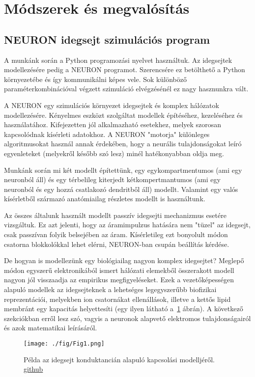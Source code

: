 \section{Módszerek és megvalósítás}

\subsection{NEURON idegsejt szimulációs program}
A munkánk során a Python programozási nyelvet használtuk. Az idegsejtek modellezésére pedig a NEURON programot. Szerencsére ez betölthető a Python környezetébe és így kommunikálni képes vele. Sok különböző paraméterkombinációval végzett szimuláció elvégzésénél ez nagy hasznunkra vált.

A NEURON egy szimulációs környezet idegsejtek és komplex hálózatok modellezésére. Kényelmes eszközt szolgáltat modellek építéséhez, kezeléséhez és használatához. Kifejezetten jól alkalmazható esetekhez, melyek szorosan kapcsolódnak kísérleti adatokhoz. A NEURON "motorja" különleges algoritmusokat használ annak érdekében, hogy a neurális tulajdonságokat leíró egyenleteket (melyekről később szó lesz) minél hatékonyabban oldja meg. 

Munkánk során mi két modellt építettünk, egy egykompartmentumos (ami egy neuronból áll) és egy térbelileg kiterjedt kétkompertmantumos (ami egy neuronból és egy hozzá csatlakozó dendritből áll) modellt. Valamint egy valós kísérletből származó anatómiailag részletes modellt is használtunk.

Az összes általunk használt modellt passzív idegsejti mechanizmus esetére vizsgáltuk. Ez azt jelenti, hogy az áramimpulzus hatására nem "tüzel" az idegsejt, csak passzívan folyik belsejében az áram. Kísérletileg ezt bonyolult módon csatorna blokkolókkal lehet elérni, NEURON-ban csupán beállítás kérdése.

 De hogyan is modellezünk egy biológiailag nagyon komplex idegsejtet? Meglepő módon egyszerű elektronikából ismert hálózati elemekből összerakott modell nagyon jól visszaadja az empirikus megfigyeléseket. Ezek a vezetőképességen alapuló modellek az idegsejteknek a lehetséges legegyszerűbb biofizikai reprezentációi, melyekben ion csatornákat ellenállások, illetve a kettős lipid membránt egy kapacitás helyettesíti (egy ilyen látható a~\ref{fig:fig1} ábrán). A következő szekciókban erről lesz szó, vagyis a neuronok alapvető elektromos tulajdonságairól és azok matematikai leírásáról.

\begin{figure}[!htb]
	\centering
	\texttt{[image: ./fig/Fig1.png]}
	\caption[Idegsejt modell]{Példa az idegsejt konduktancián alapuló kapcsolási modelljéről. \\ \href{http://www.scholarpedia.org/w/images/e/eb/Fig1.png}{github}}
		\label{fig:fig1}
\end{figure}





